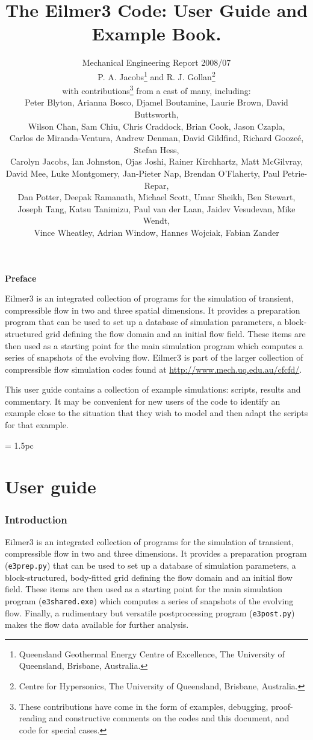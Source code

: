 \documentclass[12pt,a4paper,twoside]{article}
\title{
    The Eilmer3 Code: User Guide and Example Book.
}
\author{
    Mechanical Engineering Report 2008/07\\
    P. A. Jacobs\thanks{Queensland Geothermal Energy Centre of Excellence, The University of Queensland, Brisbane, Australia.} 
    and 
    R. J. Gollan\thanks{Centre for Hypersonics, The University of Queensland, Brisbane, Australia.}\\
    {\normalsize with contributions\thanks{These contributions have come in the form of examples, debugging, 
    proof-reading and constructive comments on the codes and this document, and code for special cases.}
    from a cast of many, including:}\\
    {\normalsize Peter Blyton,}
    {\normalsize Arianna Bosco,}
    {\normalsize Djamel Boutamine,}
    {\normalsize Laurie Brown,}
    {\normalsize David Buttsworth,} \\
    {\normalsize Wilson Chan,} 
    {\normalsize Sam Chiu,}
    {\normalsize Chris Craddock,} 
    {\normalsize Brian Cook,} 
    {\normalsize Jason Czapla,} \\
    {\normalsize Carlos de Miranda-Ventura,} 
    {\normalsize Andrew Denman,} 
    {\normalsize David Gildfind,} 
    {\normalsize Richard Gooze\'{e},}
    {\normalsize Stefan Hess,} \\
    {\normalsize Carolyn Jacobs,} 
    {\normalsize Ian Johnston,}
    {\normalsize Ojas Joshi,}
    {\normalsize Rainer Kirchhartz,} 
    {\normalsize Matt McGilvray,} \\
    {\normalsize David Mee,} 
    {\normalsize Luke Montgomery,} 
    {\normalsize Jan-Pieter Nap,} 
    {\normalsize Brendan O'Flaherty,} 
    {\normalsize Paul Petrie-Repar,} \\
    {\normalsize Dan Potter,} 
    {\normalsize Deepak Ramanath,}
    {\normalsize Michael Scott,}
    {\normalsize Umar Sheikh,} 
    {\normalsize Ben Stewart,} \\
    {\normalsize Joseph Tang,} 
    {\normalsize Katsu Tanimizu,} 
    {\normalsize Paul van der Laan,} 
    {\normalsize Jaidev Vesudevan,} 
    {\normalsize Mike Wendt,} \\
    {\normalsize Vince Wheatley,} 
    {\normalsize Adrian Window,} 
    {\normalsize Hannes Wojciak,}
    {\normalsize Fabian Zander}
}
\begin{document}
\maketitle

\centerline{\textbf{Preface}}
Eilmer3 is an integrated collection of programs for the simulation of transient,
compressible flow in two and three spatial dimensions.
It provides a preparation program that can be used to set up a database of
simulation parameters, a block-structured grid defining the flow domain and an
initial flow field.
These items are then used as a starting point for the main simulation program
which computes a series of snapshots of the evolving flow.
Eilmer3 is part of the larger collection of compressible flow simulation codes
found at \url{http://www.mech.uq.edu.au/cfcfd/}.

\medskip
This user guide contains a collection of example simulations: scripts, results
and commentary.
It may be convenient for new users of the code to identify an example
close to the situation that they wish to model and then adapt the 
scripts for that example.

\cleardoublepage
\tableofcontents

\cleardoublepage
\baselineskip = 1.5pc

\part{User guide}

\section{Introduction}
%
Eilmer3 is an integrated collection of programs for the simulation of transient,
compressible flow in two and three dimensions.
It provides a preparation program (\texttt{e3prep.py}) that can be used to set up a database of
simulation parameters, a block-structured, body-fitted grid defining the flow domain and an
initial flow field.
These items are then used as a starting point for the main simulation program (\texttt{e3shared.exe})
which computes a series of snapshots of the evolving flow.
Finally, a rudimentary but versatile postprocessing program (\texttt{e3post.py}) makes the flow data
available for further analysis.
\end{document}
